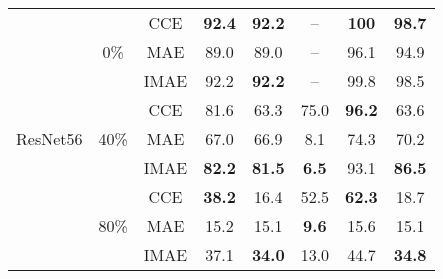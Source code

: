 \documentclass{article}
\begin{document}
\begin{table*}[!t]
\begin{tabular}{lccccccc}
		\midrule
		
		
		
		\multirow{9}{*}{ResNet56}
&\multirow{3}{*}{0\%}
		&CCE & \textbf{92.4} & \textbf{92.2} & -- & \textbf{100} & \textbf{98.7}\\
		&&MAE & 89.0 & 89.0 & -- & 96.1 & 94.9\\
&&IMAE & 92.2 & \textbf{92.2} & -- & 99.8 & 98.5\\
\cmidrule{2-8}
&\multirow{3}{*}{40\%}
		&CCE & 81.6 & 63.3 & 75.0 & \textbf{96.2} & 63.6\\
		&&MAE & 67.0 & 66.9 & 8.1 & 74.3 & 70.2\\
&&IMAE & \textbf{82.2} & \textbf{81.5} & \textbf{6.5} & 93.1  & \textbf{86.5}\\
\cmidrule{2-8}
		
		&\multirow{3}{*}{80\%}
		&CCE & \textbf{38.2} & 16.4 & 52.5 & \textbf{62.3} & 18.7\\
		&&MAE & 15.2 & 15.1 & \textbf{9.6} & 15.6 & 15.1 \\
&&IMAE & 37.1 & \textbf{34.0} & 13.0 & 44.7 & \textbf{34.8} \\
\bottomrule
	\end{tabular}
\end{table*}
\end{document}
